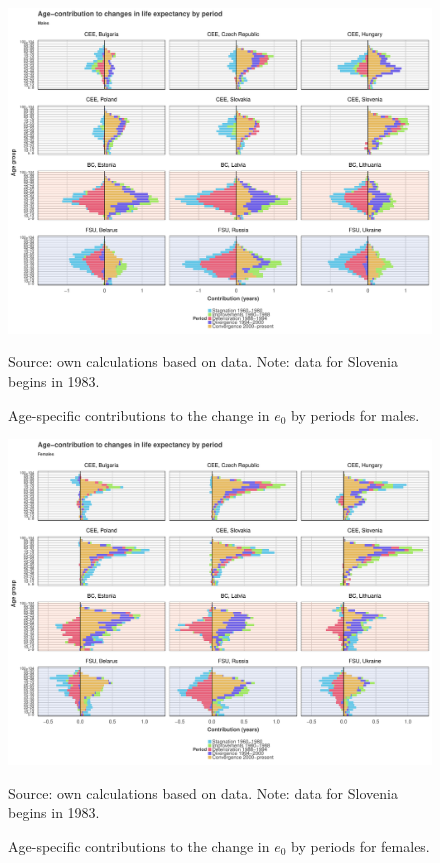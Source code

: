 \documentclass{article}
\begin{document}
\begin{figure}[h!]
\caption{Age-specific contributions to the change in $e_0$ by periods for males.}
\centering
\begin{center}
\includegraphics[scale=.46]{Figures/Age_e0_decomp_Males.pdf}
\end{center}
Source: own calculations based on \citet{HMD} data. Note: data for Slovenia begins in 1983.
\end{figure}

\newpage

\begin{figure}[h!]
\caption{Age-specific contributions to the change in $e_0$ by periods for females.}
\centering
\begin{center}
\includegraphics[scale=.46]{Figures/Age_e0_decomp_Females.pdf}
\end{center}
Source: own calculations based on \citet{HMD} data. Note: data for Slovenia begins in 1983.
\end{figure}
\end{document}
